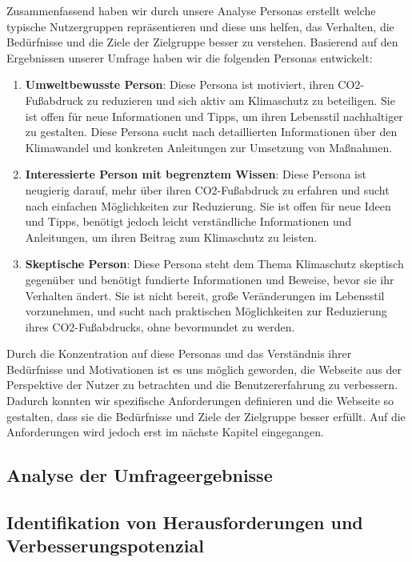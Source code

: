 Zusammenfassend haben wir durch unsere Analyse Personas erstellt welche typische Nutzergruppen repräsentieren und diese uns helfen, das Verhalten, die Bedürfnisse und die Ziele der Zielgruppe besser zu verstehen. Basierend auf den Ergebnissen unserer Umfrage haben wir die folgenden Personas entwickelt:

\begin{enumerate}
    \item \textbf{Umweltbewusste Person}: Diese Persona ist motiviert, ihren CO2-Fußabdruck zu reduzieren und sich aktiv am Klimaschutz zu beteiligen. Sie ist offen für neue Informationen und Tipps, um ihren Lebensstil nachhaltiger zu gestalten. Diese Persona sucht nach detaillierten Informationen über den Klimawandel und konkreten Anleitungen zur Umsetzung von Maßnahmen.
    \item \textbf{Interessierte Person mit begrenztem Wissen}: Diese Persona ist neugierig darauf, mehr über ihren CO2-Fußabdruck zu erfahren und sucht nach einfachen Möglichkeiten zur Reduzierung. Sie ist offen für neue Ideen und Tipps, benötigt jedoch leicht verständliche Informationen und Anleitungen, um ihren Beitrag zum Klimaschutz zu leisten.

    \item \textbf{Skeptische Person}: Diese Persona steht dem Thema Klimaschutz skeptisch gegenüber und benötigt fundierte Informationen und Beweise, bevor sie ihr Verhalten ändert. Sie ist nicht bereit, große Veränderungen im Lebensstil vorzunehmen, und sucht nach praktischen Möglichkeiten zur Reduzierung ihres CO2-Fußabdrucks, ohne bevormundet zu werden.
\end{enumerate}

Durch die Konzentration auf diese Personas und das Verständnis ihrer Bedürfnisse und Motivationen ist es uns möglich geworden, die Webseite aus der Perspektive der Nutzer zu betrachten und die Benutzererfahrung zu verbessern. Dadurch konnten wir spezifische Anforderungen definieren und die Webseite so gestalten, dass sie die Bedürfnisse und Ziele der Zielgruppe besser erfüllt. Auf die Anforderungen wird jedoch erst im nächste Kapitel eingegangen.

\subsection{Analyse der Umfrageergebnisse}

\subsection{Identifikation von Herausforderungen und Verbesserungspotenzial}

